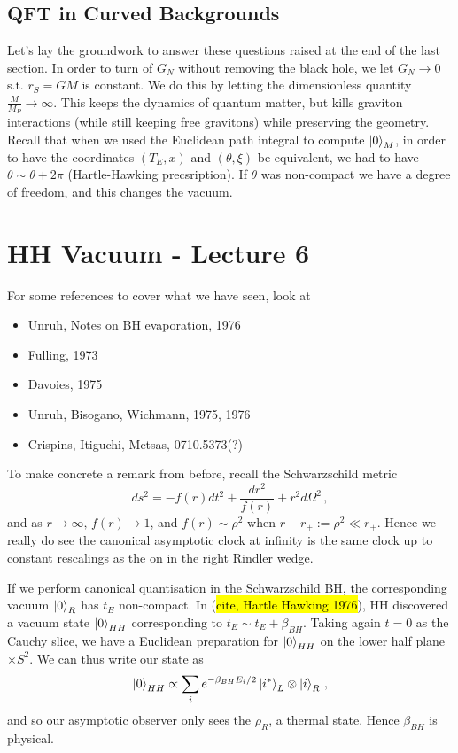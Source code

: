 \documentclass{article}
\begin{document}
\subsection{QFT in Curved Backgrounds}
Let's lay the groundwork to answer these questions raised at the end of the last section. In order to turn of $G_N$ without removing the black hole, we let $G_N \to 0$ s.t. $r_S = GM$ is constant. We do this by letting the dimensionless quantity $\frac{M}{M_P} \to \infty$. This keeps the dynamics of quantum matter, but kills graviton interactions (while still keeping free gravitons) while preserving the geometry. \\
Recall that when we used the Euclidean path integral to compute $\ket{0}_M$, in order to have the coordinates $(T_E, x)$ and $(\theta, \xi)$ be equivalent, we had to have $ \theta \sim \theta + 2\pi$ (Hartle-Hawking precsription). If $\theta$ was non-compact we have a degree of freedom, and this changes the vacuum. 

\section{HH Vacuum - Lecture 6}
\begin{remark}
	For some references to cover what we have seen, look at 
	\begin{itemize}
		\item Unruh, Notes on BH evaporation, 1976
		\item Fulling, 1973
		\item Davoies, 1975
		\item Unruh, Bisogano, Wichmann, 1975, 1976
		\item Crispins, Itiguchi, Metsas, 0710.5373(?)
	\end{itemize}
\end{remark}

\begin{remark}
	To make concrete a remark from before, recall the Schwarzschild metric 
	\[
	ds^2 = -f(r)dt^2 + \frac{dr^2}{f(r)} + r^2 d \Omega^2 \, , 
	\]
	and as $r \to \infty, \, f(r) \to 1$, and $f(r) \sim \rho^2$ when $r-r_+ := \rho^2 \ll r_+$. Hence we really do see the canonical asymptotic clock at infinity is the same clock up to constant rescalings as the on in the right Rindler wedge. 
\end{remark}
If we perform canonical quantisation in the Schwarzschild BH, the corresponding vacuum $\ket{0}_R$ has $t_E$ non-compact. In (\hl{cite, Hartle Hawking 1976}), HH discovered a vacuum state $\ket{0}_{HH}$ corresponding to $t_E \sim t_E + \beta_{BH}$. Taking again $t=0$ as the Cauchy slice, we have a Euclidean preparation for $\ket{0}_{HH}$ on the lower half plane $\times S^2$. We can thus write our state as 
\[
\ket{0}_{HH} \propto \sum_i e^{-\beta_{BH} E_i/2} \ket{i^\ast}_L \otimes \ket{i}_R \, , 
\]
and so our asymptotic observer only sees the $\rho_R$, a thermal state. Hence $\beta_{BH}$ is physical. 
\end{document}
